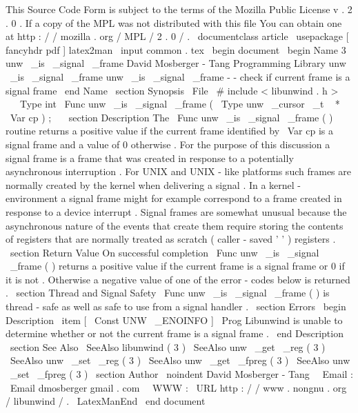 %
This
Source
Code
Form
is
subject
to
the
terms
of
the
Mozilla
Public
%
License
v
.
2
.
0
.
If
a
copy
of
the
MPL
was
not
distributed
with
this
%
file
You
can
obtain
one
at
http
:
/
/
mozilla
.
org
/
MPL
/
2
.
0
/
.
\
documentclass
{
article
}
\
usepackage
[
fancyhdr
pdf
]
{
latex2man
}
\
input
{
common
.
tex
}
\
begin
{
document
}
\
begin
{
Name
}
{
3
}
{
unw
\
_is
\
_signal
\
_frame
}
{
David
Mosberger
-
Tang
}
{
Programming
Library
}
{
unw
\
_is
\
_signal
\
_frame
}
unw
\
_is
\
_signal
\
_frame
-
-
check
if
current
frame
is
a
signal
frame
\
end
{
Name
}
\
section
{
Synopsis
}
\
File
{
\
#
include
<
libunwind
.
h
>
}
\
\
\
Type
{
int
}
\
Func
{
unw
\
_is
\
_signal
\
_frame
}
(
\
Type
{
unw
\
_cursor
\
_t
~
*
}
\
Var
{
cp
}
)
;
\
\
\
section
{
Description
}
The
\
Func
{
unw
\
_is
\
_signal
\
_frame
}
(
)
routine
returns
a
positive
value
if
the
current
frame
identified
by
\
Var
{
cp
}
is
a
signal
frame
and
a
value
of
0
otherwise
.
For
the
purpose
of
this
discussion
a
signal
frame
is
a
frame
that
was
created
in
response
to
a
potentially
asynchronous
interruption
.
For
UNIX
and
UNIX
-
like
platforms
such
frames
are
normally
created
by
the
kernel
when
delivering
a
signal
.
In
a
kernel
-
environment
a
signal
frame
might
for
example
correspond
to
a
frame
created
in
response
to
a
device
interrupt
.
Signal
frames
are
somewhat
unusual
because
the
asynchronous
nature
of
the
events
that
create
them
require
storing
the
contents
of
registers
that
are
normally
treated
as
scratch
(
caller
-
saved
'
'
)
registers
.
\
section
{
Return
Value
}
On
successful
completion
\
Func
{
unw
\
_is
\
_signal
\
_frame
}
(
)
returns
a
positive
value
if
the
current
frame
is
a
signal
frame
or
0
if
it
is
not
.
Otherwise
a
negative
value
of
one
of
the
error
-
codes
below
is
returned
.
\
section
{
Thread
and
Signal
Safety
}
\
Func
{
unw
\
_is
\
_signal
\
_frame
}
(
)
is
thread
-
safe
as
well
as
safe
to
use
from
a
signal
handler
.
\
section
{
Errors
}
\
begin
{
Description
}
\
item
[
\
Const
{
UNW
\
_ENOINFO
}
]
\
Prog
{
Libunwind
}
is
unable
to
determine
whether
or
not
the
current
frame
is
a
signal
frame
.
\
end
{
Description
}
\
section
{
See
Also
}
\
SeeAlso
{
libunwind
(
3
)
}
\
SeeAlso
{
unw
\
_get
\
_reg
(
3
)
}
\
SeeAlso
{
unw
\
_set
\
_reg
(
3
)
}
\
SeeAlso
{
unw
\
_get
\
_fpreg
(
3
)
}
\
SeeAlso
{
unw
\
_set
\
_fpreg
(
3
)
}
\
section
{
Author
}
\
noindent
David
Mosberger
-
Tang
\
\
Email
:
\
Email
{
dmosberger
gmail
.
com
}
\
\
WWW
:
\
URL
{
http
:
/
/
www
.
nongnu
.
org
/
libunwind
/
}
.
\
LatexManEnd
\
end
{
document
}
